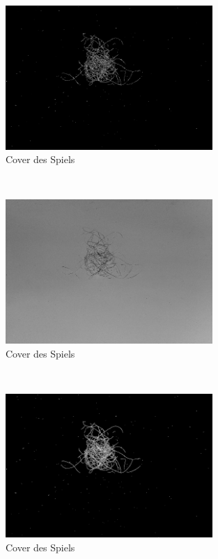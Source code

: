 \documentclass[german,a4paper,12pt,smallheadings,headsepline, titlepage, liststotoc, idextotoc,bibtoctoc,blibliography = totocnumbered]{scrartcl}
\begin{document}
\begin{figure}
	\centering
	\includegraphics[width=0.7\textwidth]{figBina/04edges.png}
	\caption[]{Cover des Spiels}
	\label{img:Bina01}
\end{figure}\\
\begin{figure}
	\centering
	\includegraphics[width=0.7\textwidth]{figBina/05gray.png}
	\caption[]{Cover des Spiels}
	\label{img:Bina01}
\end{figure}\\
\begin{figure}
	\centering
	\includegraphics[width=0.7\textwidth]{figBina/05intenstiy.png}
	\caption[]{Cover des Spiels}
	\label{img:Bina01}
\end{figure}\\
\end{document}
